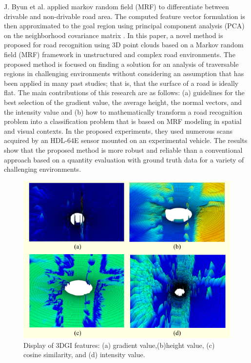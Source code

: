 \noindent
J. Byun et al. applied markov random field (MRF) to differentiate between drivable and non-drivable road area. The computed feature vector formulation is then approximated to the goal region using principal component analysis (PCA) on the neighborhood covariance matrix \cite{R17}. In this paper, a novel method is proposed for road recognition using 3D point clouds based on a Markov random field (MRF) framework in unstructured and complex road environments. The proposed method is focused on finding a solution for an analysis of traversable regions in challenging environments without considering an assumption that has been applied in many past studies; that is, that the surface of a road is ideally flat. The main contributions of this research are as follows: (a) guidelines for the best selection of the gradient value, the average height, the normal vectors, and the intensity value and (b) how to mathematically transform a road recognition problem into a classification problem that is based on MRF modeling in spatial and visual contexts. In the proposed  experiments, they used numerous scans acquired by an HDL-64E sensor mounted on an experimental vehicle. The results show that the proposed method is more robust and reliable than a conventional approach based on a quantity evaluation with ground truth data for a variety of challenging environments. 
\begin{figure}[H]
    \centering
    \includegraphics{Figures/chapter2/3dmethod2.png}
    \caption{Display of 3DGI features: (a) gradient value,(b)height value, (c) cosine similarity, and (d) intensity value.}
    \label{fig:3d2}
\end{figure}

